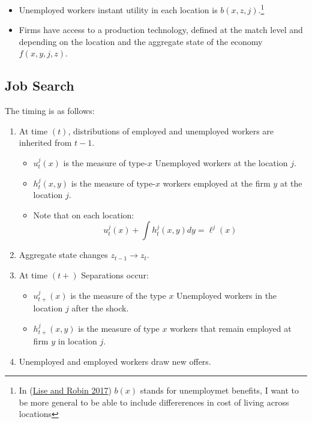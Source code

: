 \documentclass[
  letterpaper,
  DIV=11,
  numbers=noendperiod]{scrreprt}
\providecommand{\tightlist}{%
  \setlength{\itemsep}{0pt}\setlength{\parskip}{0pt}}\usepackage{longtable,booktabs,array}
\begin{document}
\begin{itemize}
\tightlist
\item
  Unemployed workers instant utility in each location is
  \(b(x,z,j)\).\footnote{In
    (\protect\hyperlink{ref-liseMacrodynamicsSortingWorkers2017}{Lise
    and Robin 2017}) \(b(x)\) stands for unemploymet benefits, I want to
    be more general to be able to include differerences in cost of
    living across locations}
\item
  Firms have access to a production technology, defined at the match
  level and depending on the location and the aggregate state of the
  economy \(f(x, y, j, z)\).
\end{itemize}

\hypertarget{job-search}{%
\subsection{Job Search}\label{job-search}}

The timing is as follows:

\begin{enumerate}
\def\labelenumi{\arabic{enumi}.}
\tightlist
\item
  At time \((t)\), distributions of employed and unemployed workers are
  inherited from \(t-1\).

  \begin{itemize}
  \tightlist
  \item
    \(u^j_t(x)\) is the measure of type-\(x\) Unemployed workers at the
    location \(j\).
  \item
    \(h^j_t(x,y)\) is the measure of type-\(x\) workers employed at the
    firm \(y\) at the location \(j\).
  \item
    Note that on each location:
    \[u^j_t(x) + \int h^j_t(x,y) dy = \ell^j(x)\]
  \end{itemize}
\item
  Aggregate state changes \(z_{t-1} \to z_{t}\).
\item
  At time \((t+)\) Separations occur:

  \begin{itemize}
  \tightlist
  \item
    \(u^j_{t+}(x)\) is the measure of the type \(x\) Unemployed workers
    in the location \(j\) after the shock.
  \item
    \(h^j_{t+}(x,y)\) is the measure of type \(x\) workers that remain
    employed at firm \(y\) in location \(j\).
  \end{itemize}
\item
  Unemployed and employed workers draw new offers.
\end{enumerate}
\end{document}
